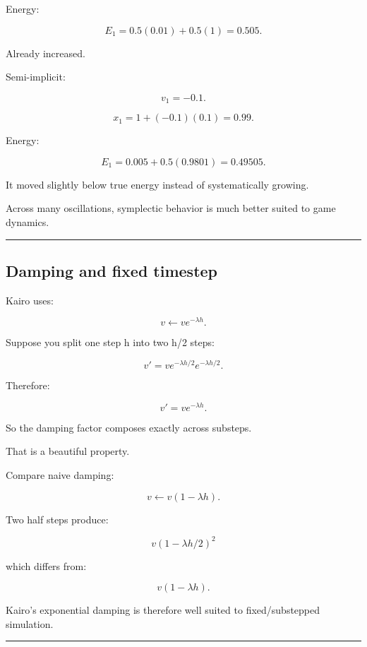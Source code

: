 Energy:

\[
E_1
=
0.5(0.01)
+
0.5(1)
=
0.505.
\]

Already increased.

Semi-implicit:

\[
v_1=-0.1.
\]

\[
x_1=1+(-0.1)(0.1)=0.99.
\]

Energy:

\[
E_1
=
0.005+
0.5(0.9801)
=
0.49505.
\]

It moved slightly below true energy instead of systematically growing.

Across many oscillations, symplectic behavior is much better suited to game dynamics.

\begin{center}\rule{0.5\linewidth}{0.5pt}\end{center}

\subsection{Damping and fixed timestep}\label{06-engine-ii-ch038-damping-and-fixed-timestep}

\hypertarget{06-engine-ii-ch038-damping-and-fixed-timestep}{}

Kairo uses:

\[
v\leftarrow ve^{-\lambda h}.
\]

Suppose you split one step h into two h/2 steps:

\[
v'
=
v e^{-\lambda h/2}
e^{-\lambda h/2}.
\]

Therefore:

\[
v'
=
v e^{-\lambda h}.
\]

So the damping factor composes exactly across substeps.

That is a beautiful property.

Compare naive damping:

\[
v\leftarrow v(1-\lambda h).
\]

Two half steps produce:

\[
v(1-\lambda h/2)^2
\]

which differs from:

\[
v(1-\lambda h).
\]

Kairo's exponential damping is therefore well suited to fixed/substepped simulation.

\begin{center}\rule{0.5\linewidth}{0.5pt}\end{center}


